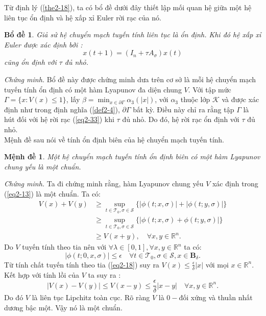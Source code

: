 \documentclass[14pt,a4paper,oneside]{report}		%
\newtheorem{lemma}[theorem]{Bổ đề}
\newtheorem{proposition}[theorem]{Mệnh đề}
\begin{document}
Từ định lý (\ref{the2-18}), ta có bổ đề dưới đây thiết lập mối quan hệ giữa một hệ liên tục ổn định và hệ xấp xỉ Euler rời rạc của nó.

\begin{lemma} \label{le2-19}
Giả sử hệ chuyển mạch tuyến tính liên tục là ổn định. Khi đó hệ xấp xỉ Euler được xác định bởi :
\begin{equation} \label{eq2-33}
x(t+1)=(I_n+\tau A_\sigma)x(t)
\end{equation}
cũng ổn định với $\tau$ đủ nhỏ.
\end{lemma}
\textit{Chứng minh.} Bổ đề này được chứng minh dưa trên cơ sở là mỗi hệ chuyển mạch tuyến tính ổn định có một hàm Lyapunov đa diện chung $V$. Với tập mức $\Gamma =\{x:V(x)\leq 1\}$, lấy $\beta = \min_{x\in\partial\Gamma}\alpha_3(|x|)$, với $\alpha_3$ thuộc lớp $\mathcal{K}$ và được xác định như trong định nghĩa (\ref{def2-4}), $\partial\Gamma$ bất kỳ. Điều này chỉ ra rằng tập $\Gamma$ là hút đối với hệ rời rạc (\ref{eq2-33}) khi $\tau$ đủ nhỏ. Do đó, hệ rời rạc ổn định với $\tau$ đủ nhỏ.\\

Mệnh đề sau nói về tính ổn định biên của hệ chuyển mạch tuyến tính.

\begin{proposition} \label{pro2-21}
Một hệ chuyển mạch tuyến tính ổn định biên có một hàm Lyapunov chung yếu là một chuẩn.
\end{proposition}

\textit{Chứng minh.} Ta đi chứng minh rằng, hàm Lyapunov chung yếu $V$ xác định trong (\ref{eq2-13}) là một chuẩn. Ta có:
\begin{equation}
\begin{split}
V(x)+V(y) & \geq \sup_{t\in\mathcal{T}_0,\sigma\in\mathcal{S}}\{|\phi(t;x,\sigma)|+|\phi(t;y,\sigma)|\}\\
& \geq \sup_{t\in\mathcal{T}_0,\sigma\in\mathcal{S}}\{|\phi(t;x,\sigma)+\phi(t;y,\sigma)|\}\\
& \geq V(x+y),\quad\forall x,y\in\mathbb{R}^n.
\end{split}
\end{equation}
Do $V$ tuyến tính theo tia nên với $\forall\lambda\in[0,1],\forall x,y\in\mathbb{R}^n$ ta có:
$$|\phi(t;0,x,\sigma)|\leq\epsilon\quad\forall t\in\mathcal{T}_0,\sigma\in\mathcal{S},x\in\mathbf{B}_\delta.$$
Từ tính chất tuyến tính theo tia (\ref{eq2-18}) suy ra $V(x)\leq\frac{\epsilon}{\delta}|x|$ với mọi $x\in\mathbb{R}^n$.\\
Kết hợp với tính lồi của $V$ ta suy ra :
$$|V(x)-V(y)|\leq V(x-y)\leq \frac{\epsilon}{\delta}|x-y|\quad\forall x,y\in\mathbb{R}^n.$$
Do đó $V$ là liên tục Lipchitz toàn cục. Rõ ràng $V$ là $0-$đối xứng và thuần nhất dương bậc một. Vậy nó là một chuẩn.\\
\end{document}
